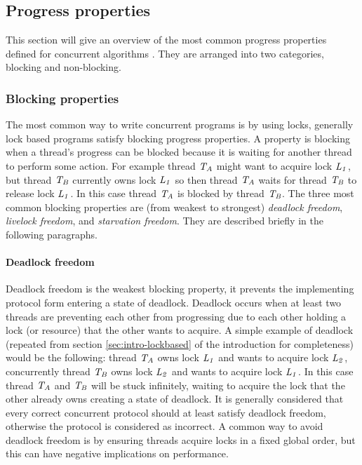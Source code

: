 \subsection{Progress properties}
This section will give an overview of the most common progress properties defined
for concurrent algorithms \cite{R13}.
They are arranged into two categories, blocking and non-blocking.

\subsubsection{Blocking properties}
The most common way to write concurrent programs is by using locks,
generally lock based programs satisfy blocking progress properties.
A property is blocking when a thread's progress can be blocked because it is waiting
for another thread to perform some action.
For example thread $\ms{T_A}$ might want to acquire lock $\ms{L_1}$, but thread $\ms{T_B}$ currently owns lock $\ms{L_1}$
so then thread $\ms{T_A}$ waits for thread $\ms{T_B}$ to release lock $\ms{L_1}$.
In this case thread $\ms{T_A}$ is blocked by thread $\ms{T_B}$.
The three most common blocking properties are (from weakest to
strongest) \emph{deadlock freedom}, \emph{livelock freedom},
and \emph{starvation freedom}.
They are described briefly in the following paragraphs.

\paragraph{Deadlock freedom}
Deadlock freedom is the weakest blocking property, it prevents the implementing protocol
form entering a state of deadlock.
Deadlock occurs when at least two threads are preventing each other from progressing
due to each other holding a lock (or resource) that the other wants to acquire.
A simple example of deadlock (repeated from section \ref{sec:intro-lockbased} of the introduction for completeness) would be the following:
thread $\ms{T_A}$ owns lock $\ms{L_1}$ and wants to acquire lock $\ms{L_2}$, concurrently
thread $\ms{T_B}$ owns lock $\ms{L_2}$ and wants to acquire lock $\ms{L_1}$.
In this case thread $\ms{T_A}$ and $\ms{T_B}$ will be stuck infinitely, waiting to acquire the lock that the other
already owns creating a state of deadlock.
It is generally considered that every correct concurrent protocol should at least satisfy deadlock
freedom, otherwise the protocol is considered as incorrect.
A common way to avoid deadlock freedom is by ensuring threads acquire locks in a fixed global order,
but this can have negative implications on performance.

